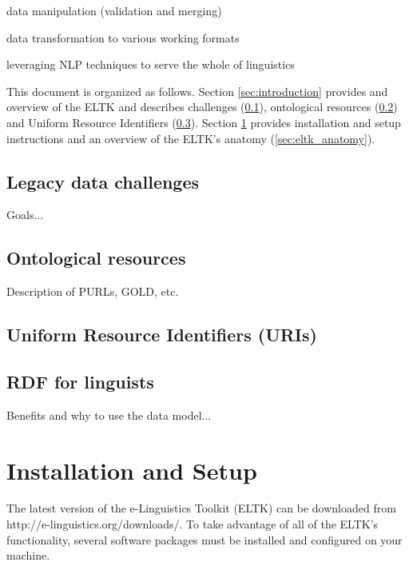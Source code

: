 \documentclass[]{article}
\begin{document}
data manipulation (validation and merging)

data transformation to various working formats

leveraging NLP techniques to serve the whole of linguistics


This document is organized as follows. Section \ref{sec:introduction} provides and overview of the ELTK and describes challenges (\ref{sec:legacy}), ontological resources (\ref{sec:ontological}) and Uniform Resource Identifiers (\ref{sec:uris}). Section \ref{sec:install} provides installation and setup instructions and an overview of the ELTK's anatomy (\ref{sec:eltk_anatomy}).

\begin{comment}
\subsection{Additional Resources}
Do we need any additional resources?
\end{comment}

\subsection{Legacy data challenges}\label{sec:legacy}
Goals...

\subsection{Ontological resources}\label{sec:ontological}
Description of PURLs, GOLD, etc.

\subsection{Uniform Resource Identifiers (URIs)}\label{sec:uris}

\subsection{RDF for linguists}
Benefits and why to use the data model...



\section{Installation and Setup}\label{sec:install}
The latest version of the e-Linguistics Toolkit (ELTK) can be downloaded from http://e-linguistics.org/downloads/. To take advantage of all of the ELTK's functionality, several software packages must be installed and configured on your machine. 
\end{document}
